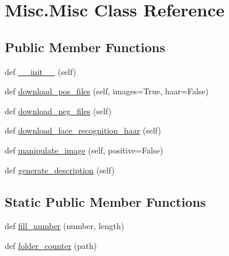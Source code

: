 \hypertarget{class_misc_1_1_misc}{}\section{Misc.\+Misc Class Reference}
\label{class_misc_1_1_misc}
\subsection*{Public Member Functions}
\begin{DoxyCompactItemize}
\item 
def \mbox{\hyperlink{class_misc_1_1_misc_a2361f15b11e4875dff86f4bedf58dc31}{\+\_\+\+\_\+init\+\_\+\+\_\+}} (self)
\item 
def \mbox{\hyperlink{class_misc_1_1_misc_a911cb2d9726dcdbf6ef25607522cedc0}{download\+\_\+pos\+\_\+files}} (self, images=True, haar=False)
\item 
def \mbox{\hyperlink{class_misc_1_1_misc_aea6e1bbdef723dfbe94899cd18399b93}{download\+\_\+neg\+\_\+files}} (self)
\item 
def \mbox{\hyperlink{class_misc_1_1_misc_a04c3efa3e287f2aba4cefbb2c11d0098}{download\+\_\+face\+\_\+recognition\+\_\+haar}} (self)
\item 
def \mbox{\hyperlink{class_misc_1_1_misc_aebc81e32ad0507ccbccd8173d9a0ff50}{manipulate\+\_\+image}} (self, positive=False)
\item 
def \mbox{\hyperlink{class_misc_1_1_misc_a850d818bacc25df0ecc2ae05b9b15f89}{generate\+\_\+description}} (self)
\end{DoxyCompactItemize}
\subsection*{Static Public Member Functions}
\begin{DoxyCompactItemize}
\item 
def \mbox{\hyperlink{class_misc_1_1_misc_a58fba0bed4c5f2ff76cdf83e20670fb4}{fill\+\_\+number}} (number, length)
\item 
def \mbox{\hyperlink{class_misc_1_1_misc_a8d30d14e25c28f7f8ac3798e501d4aaa}{folder\+\_\+counter}} (path)
\end{DoxyCompactItemize}
